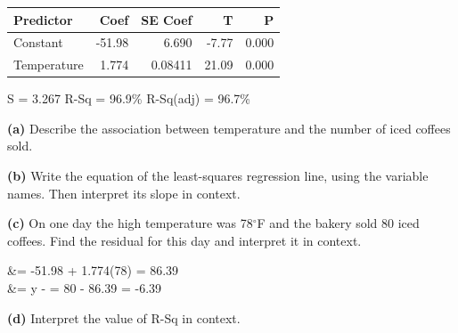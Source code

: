 \documentclass[12pt]{article}
\begin{document}
\begin{enumerate}[leftmargin=1.9em, itemsep=0.16in, resume]
        \vspace{4pt}
        {\centering\footnotesize\ttfamily
        \begin{tabular}{@{} l r r r r @{}}
        Predictor & Coef & SE Coef & T & P \\ \hline
        Constant & -51.98 & 6.690 & -7.77 & 0.000 \\
        Temperature & 1.774 & 0.08411 & 21.09 & 0.000 \\
        \end{tabular}\par
        S = 3.267 \quad R-Sq = 96.9\% \quad R-Sq(adj) = 96.7\%\par}

        \vspace{6pt}
        \textbf{(a)} Describe the association between temperature and the number of iced
        coffees sold.\\[4pt]

        \vspace{6pt}
        \boxguard[16]
        \textbf{(b)} Write the equation of the least-squares regression line, using the
        variable names. Then interpret its slope in context.\\[4pt]

        \vspace{6pt}
        \boxguard[21]
        \textbf{(c)} On one day the high temperature was 78$^\circ$F and the bakery sold 80 iced
        coffees. Find the residual for this day and interpret it in context.
        \begin{work}
           &= -51.98 + 1.774(78) = 86.39  \\
           &= y -  = 80 - 86.39 = -6.39 
        \end{work}

        \vspace{6pt}
        \boxguard[15]
        \textbf{(d)} Interpret the value of R-Sq in context.\\[4pt]


\end{enumerate}
\end{document}
